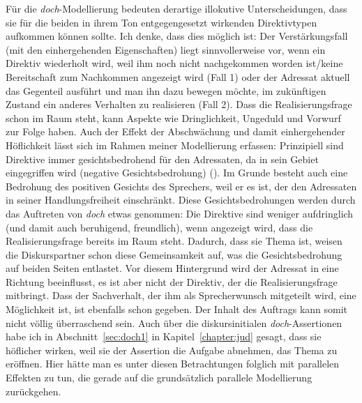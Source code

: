 {Für die \textit{doch}-Modellierung bedeuten derartige illokutive Unterscheidungen, dass sie für die beiden in ihrem Ton entgegengesetzt wirkenden Direktivtypen aufkommen können sollte. Ich denke, dass dies möglich ist: Der Verstärkungsfall (mit den einhergehenden Eigenschaften) liegt sinnvollerweise vor, wenn ein Direktiv wiederholt wird, weil ihm noch nicht nachgekommen worden ist/keine Bereitschaft zum Nachkommen angezeigt wird (Fall 1) oder der Adressat aktuell das Gegenteil ausführt und man ihn dazu bewegen möchte, im zukünftigen Zustand ein anderes Verhalten zu realisieren (Fall 2). Dass die Realisierungsfrage schon im Raum steht, kann Aspekte wie Dringlichkeit, Ungeduld und Vorwurf zur Folge haben. Auch der Effekt der Abschwächung und damit einhergehender Höflichkeit lässt sich im Rahmen meiner Modellierung erfassen: Prinzipiell sind Direktive immer gesichtsbedrohend für den Adressaten, da in sein Gebiet eingegriffen wird (negative  Gesichtsbedrohung) (\citealt[127]{Held1995}). Im Grunde besteht auch eine Bedrohung des positiven Gesichts des Sprechers, weil er es ist, der den Adressaten in seiner Handlungsfreiheit einschränkt. Diese Gesichtsbedrohungen werden durch das Auftreten von \textit{doch} etwas genommen: Die Direktive sind weniger aufdringlich (und damit auch beruhigend, freundlich), wenn angezeigt wird, dass die Realisierungsfrage bereits im Raum steht. Dadurch, dass sie Thema ist, weisen die Diskurspartner schon diese Gemeinsamkeit auf, was die Gesichtsbedrohung auf beiden Seiten entlastet. Vor diesem Hintergrund wird der Adressat in eine Richtung beeinflusst, es ist aber nicht der Direktiv, der die Realisierungsfrage mitbringt. Dass der Sachverhalt, der ihm als Sprecherwunsch mitgeteilt wird, eine Möglichkeit ist, ist ebenfalls schon gegeben. Der Inhalt des Auftrags kann somit nicht völlig überraschend sein. Auch über die diskursinitialen \textit{doch}-Assertionen habe ich in Abschnitt~\ref{sec:doch1} in Kapitel~\ref{chapter:jud} gesagt, dass sie höflicher wirken, weil sie der Assertion die \glq Aufgabe\grq {} abnehmen, das Thema zu eröffnen. Hier hätte man es unter diesen Betrachtungen folglich mit parallelen Effekten zu tun, die gerade auf die grundsätzlich parallele Modellierung zurückgehen.

}
